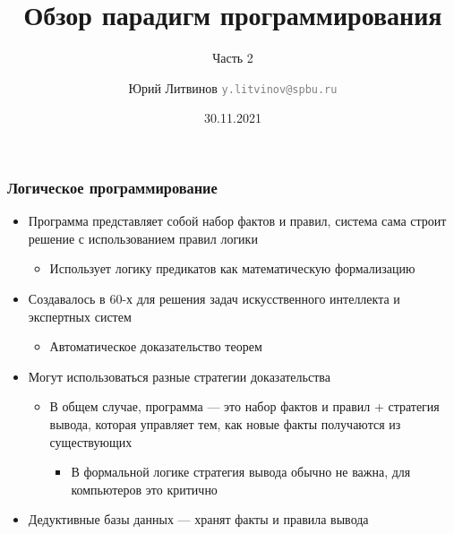 \documentclass[xetex,mathserif,serif]{beamer}
\title{Обзор парадигм программирования}
\subtitle{Часть 2}
\author[Юрий Литвинов]{Юрий Литвинов \newline \textcolor{gray}{\small\texttt{y.litvinov@spbu.ru}}}
\date{30.11.2021}
\begin{document}
    
    \frame{\titlepage}

    \begin{frame}
        \frametitle{Логическое программирование}
        \begin{itemize}
            \item Программа представляет собой набор фактов и правил, система сама строит решение с использованием правил логики
            \begin{itemize}
                \item Использует логику предикатов как математическую формализацию
            \end{itemize}
            \item Создавалось в 60-х для решения задач искусственного интеллекта и экспертных систем
            \begin{itemize}
                \item Автоматическое доказательство теорем
            \end{itemize}
            \item Могут использоваться разные стратегии доказательства
            \begin{itemize}
                \item В общем случае, программа --- это набор фактов и правил + стратегия вывода, которая управляет тем, как новые факты получаются из существующих
                \begin{itemize}
                    \item В формальной логике стратегия вывода обычно не важна, для компьютеров это критично
                \end{itemize}
            \end{itemize}
            \item Дедуктивные базы данных --- хранят факты и правила вывода
        \end{itemize}
    \end{frame}
\end{document}

